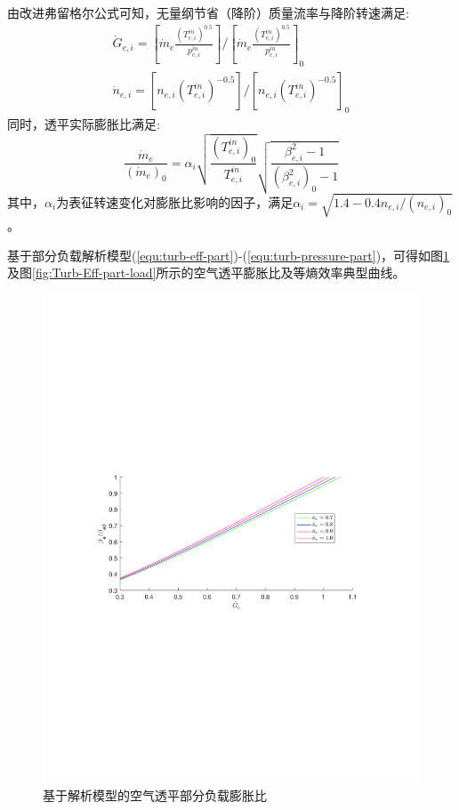由改进弗留格尔公式可知，无量纲节省（降阶）质量流率与降阶转速满足\cite{Compressor-thermo-02, AA-CAES-Simulation-19}:
\begin{subequations}
\begin{gather}
{\dot G_{e,i}} = [{{{\dot m}_e}\frac{{{{({T_{e,i}^{in}})}^{0.5}}}}{{p_{e,i}^{in}}}}]/{[{{{\dot m}_e}\frac{{{{( {T_{e,i}^{in}})}^{0.5}}}}{{p_{e,i}^{in}}}}]_0} \label{equ:reduced-turb-mass-flow} \\
{\dot n_{e,i}} = [{{n_{e,i}}{{({T_{e,i}^{in}})}^{ - 0.5}}}]/{[{{n_{e,i}}{{({T_{e,i}^{in}})}^{ - 0.5}}} ]_0}\label{equ:reduced-turb-speed}
\end{gather}
\end{subequations}
同时，透平实际膨胀比满足\cite{AA-CAES-Simulation-19}:
\begin{equation}
\label{equ:turb-pressure-part}
\frac{{{{\dot m}_e}}}{{{{({{{\dot m}_e}})}_0}}} = {\alpha _i}\sqrt {\frac{{{{({T_{e,i}^{in}})}_0}}}{{T_{e,i}^{in}}}} \sqrt {\frac{{\beta _{e,i}^2 - 1}}{{{{({\beta _{e,i}^2})}_0} - 1}}}
\end{equation}
其中，$\alpha_i$为表征转速变化对膨胀比影响的因子，满足$\alpha_i=\sqrt{1.4-0.4n_{e,i}/(n_{e,i})_0}$。

基于部分负载解析模型(\ref{equ:turb-eff-part})-(\ref{equ:turb-pressure-part})，可得如图\ref{fig:Turb-Ratio-off-design}及图\ref{fig:Turb-Eff-part-load}所示的空气透平膨胀比及等熵效率典型曲线。

\begin{figure}[H] %
  \centering
  \includegraphics[scale=0.65]{figures/Chap2-2-Turb-Ratio-off-design.pdf}
  \caption{基于解析模型的空气透平部分负载膨胀比}
  \label{fig:Turb-Ratio-off-design}
\end{figure}

